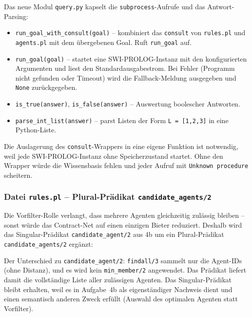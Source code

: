 Das neue Modul \texttt{query.py} kapselt die \texttt{subprocess}-Aufrufe und das Antwort-Parsing:



\begin{itemize}
    \item \texttt{run\_goal\_with\_consult(goal)} -- kombiniert das \texttt{consult} von \texttt{rules.pl} und \texttt{agents.pl} mit dem übergebenen Goal. Ruft \texttt{run\_goal} auf.
    \item \texttt{run\_goal(goal)} -- startet eine \acs{SWI}-\acs{PROLOG}-Instanz mit den konfigurierten Argumenten und liest den Standardausgabestrom. Bei Fehler (Programm nicht gefunden oder Timeout) wird die Fallback-Meldung ausgegeben und \texttt{None} zurückgegeben.
    \item \texttt{is\_true(answer)}, \texttt{is\_false(answer)} -- Auswertung boolescher Antworten.
    \item \texttt{parse\_int\_list(answer)} -- parst Listen der Form \texttt{L = [1,2,3]} in eine Python-Liste.
\end{itemize}

Die Auslagerung des \texttt{consult}-Wrappers in eine eigene Funktion ist notwendig, weil jede \acs{SWI}-\acs{PROLOG}-Instanz ohne Speicherzustand startet. Ohne den Wrapper würde die Wissensbasis fehlen und jeder Aufruf mit \texttt{Unknown procedure} scheitern.


\subsubsection{Datei \texttt{rules.pl} – Plural-Prädikat \texttt{candidate\_agents/2}}

Die Vorfilter-Rolle verlangt, dass mehrere Agenten gleichzeitig zulässig bleiben -- sonst würde das Contract-Net auf einen einzigen Bieter reduziert. Deshalb wird das Singular-Prädikat \texttt{candidate\_agent/2} aus 4b um ein Plural-Prädikat \texttt{candidate\_agents/2} ergänzt:



Der Unterschied zu \texttt{candidate\_agent/2}: \texttt{findall/3} sammelt nur die Agent-IDs (ohne Distanz), und es wird kein \texttt{min\_member/2} angewendet. Das Prädikat liefert damit die vollständige Liste aller zulässigen Agenten. Das Singular-Prädikat bleibt erhalten, weil es in Aufgabe~4b als eigenständiger Nachweis dient und einen semantisch anderen Zweck erfüllt (Auswahl des optimalen Agenten statt Vorfilter).

